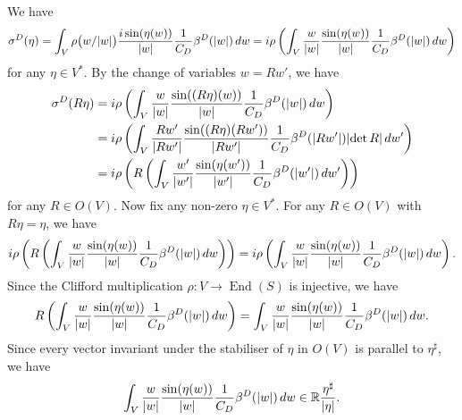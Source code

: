 \documentclass[a4paper,oneside,12pt]{amsart}
\theoremstyle{plain}
\theoremstyle{definition}
\theoremstyle{remark}
\newcommand{\R}{\mathbb{R}}
\DeclarePairedDelimiter{\abs}{\lvert}{\rvert}
\DeclareMathOperator{\End}{End}
\newcommand{\cliffordmultiplication}{\rho}
\newcommand{\cutoff}{\beta}
\newcommand{\cutoffDirac}{\cutoff^D}
\newcommand{\symbolDirac}{\sigma^D}
\begin{document}
We have
\begin{equation}
  \symbolDirac(\eta) = \int_V \cliffordmultiplication\big(w/\abs{w}\big) \frac{i \sin(\eta(w))}{\abs{w}} \frac{1}{C_D} \cutoffDirac(\abs{w}) \,dw = i \cliffordmultiplication \left( \int_V \frac{w}{\abs{w}} \frac{\sin(\eta(w))}{\abs{w}} \frac{1}{C_D} \cutoffDirac(\abs{w}) \,dw \right)
\end{equation}
for any $\eta \in V^*$.
By the change of variables $w = Rw'$, we have
\begin{equation}
  \begin{aligned}
  \symbolDirac(R\eta) ={}& i \cliffordmultiplication \left( \int_V \frac{w}{\abs{w}} \frac{\sin((R\eta)(w))}{\abs{w}} \frac{1}{C_D} \cutoffDirac(\abs{w}) \,dw \right) \\
  ={}& i \cliffordmultiplication \left( \int_V \frac{Rw'}{\abs{Rw'}} \frac{\sin((R\eta)(Rw'))}{\abs{Rw'}}  \frac{1}{C_D} \cutoffDirac(\abs{Rw'}) \abs{\det R} \,dw' \right) \\
  ={}& i \cliffordmultiplication \left( R \left( \int_V \frac{w'}{\abs{w'}} \frac{\sin(\eta(w'))}{\abs{w'}} \frac{1}{C_D} \cutoffDirac(\abs{w'}) \,dw' \right) \right)
  \end{aligned}
\end{equation}
for any $R \in O(V)$.
Now fix any non-zero $\eta \in V^*$.
For any $R \in O(V)$ with $R \eta = \eta$, we have
\begin{equation}
  i \cliffordmultiplication \left( R \left( \int_V \frac{w}{\abs{w}} \frac{\sin(\eta(w))}{\abs{w}} \frac{1}{C_D} \cutoffDirac(\abs{w}) \,dw \right) \right) = i \cliffordmultiplication \left( \int_V \frac{w}{\abs{w}} \frac{\sin(\eta(w))}{\abs{w}} \frac{1}{C_D} \cutoffDirac(\abs{w}) \,dw \right).
\end{equation}
Since the Clifford multiplication $\cliffordmultiplication \colon V \to \End(S)$ is injective, we have
\begin{equation}
  R \left( \int_V \frac{w}{\abs{w}} \frac{\sin(\eta(w))}{\abs{w}} \frac{1}{C_D} \cutoffDirac(\abs{w}) \,dw \right) =\int_V \frac{w}{\abs{w}} \frac{\sin(\eta(w))}{\abs{w}} \frac{1}{C_D} \cutoffDirac(\abs{w}) \,dw.
\end{equation}
Since every vector invariant under the stabiliser of $\eta$ in $O(V)$ is parallel to $\eta^{\sharp}$, we have
\begin{equation}
   \int_V \frac{w}{\abs{w}} \frac{\sin(\eta(w))}{\abs{w}} \frac{1}{C_D} \cutoffDirac(\abs{w}) \,dw \in \R \frac{\eta^{\sharp}}{\abs{\eta}}.
\end{equation}
\end{document}
